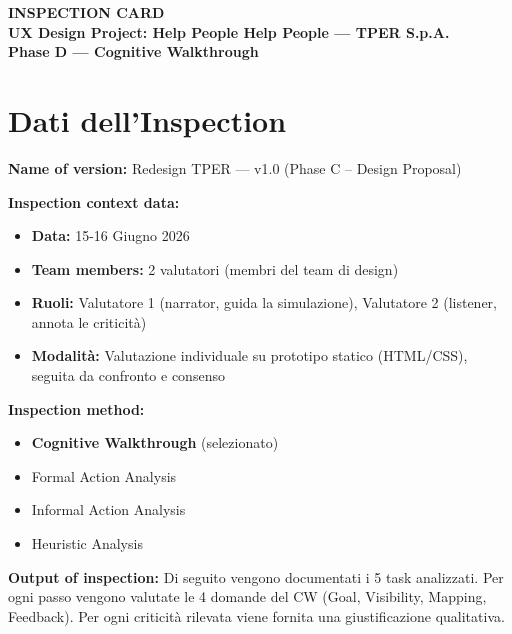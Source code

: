 \documentclass[11pt,a4paper]{article}
\begin{document}
\begin{tcolorbox}[colback=primaryColor,colframe=primaryColor,arc=3mm,halign=center,valign=center,height=2.5cm]
  \color{white}\LARGE\bfseries INSPECTION CARD \\[0.2cm]
  \color{white!80}\large UX Design Project: Help People Help People --- TPER S.p.A. \\[0.1cm]
  \color{white!60}\normalsize Phase D --- Cognitive Walkthrough
\end{tcolorbox}

\vspace{0.3cm}

\section{Dati dell'Inspection}

\begin{tcolorbox}[colback=backgroundColor,colframe=borderColor,arc=2mm]
\small

\noindent\textbf{Name of version:} Redesign TPER --- v1.0 (Phase C -- Design Proposal)

\vspace{0.3cm}
\noindent\textbf{Inspection context data:}
\begin{itemize}
  \item \textbf{Data:} 15-16 Giugno 2026
  \item \textbf{Team members:} 2 valutatori (membri del team di design)
  \item \textbf{Ruoli:} Valutatore 1 (narrator, guida la simulazione), Valutatore 2 (listener, annota le criticit\`a)
  \item \textbf{Modalit\`a:} Valutazione individuale su prototipo statico (HTML/CSS), seguita da confronto e consenso
\end{itemize}

\vspace{0.3cm}
\noindent\textbf{Inspection method:}
\begin{itemize}
  \item[$\bullet$] \textbf{Cognitive Walkthrough} (selezionato)
  \item[$\circ$] Formal Action Analysis
  \item[$\circ$] Informal Action Analysis
  \item[$\circ$] Heuristic Analysis
\end{itemize}

\vspace{0.3cm}
\noindent\textbf{Output of inspection:} Di seguito vengono documentati i 5 task analizzati. Per ogni passo vengono valutate le 4 domande del CW (Goal, Visibility, Mapping, Feedback). Per ogni criticit\`a rilevata viene fornita una giustificazione qualitativa.

\end{tcolorbox}
\end{document}

